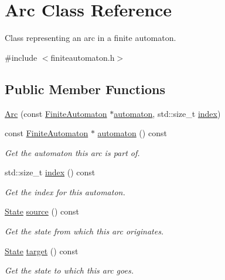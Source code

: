 \hypertarget{class_arc}{\section{\-Arc \-Class \-Reference}
\label{class_arc}
}


\-Class representing an arc in a finite automaton.  




{\ttfamily \#include $<$finiteautomaton.\-h$>$}

\subsection*{\-Public \-Member \-Functions}
\begin{DoxyCompactItemize}
\item 
\hyperlink{class_arc_afc8733da11af7ce496f5ca9dedcd1faf}{\-Arc} (const \hyperlink{class_finite_automaton}{\-Finite\-Automaton} $\ast$\hyperlink{class_arc_ae61665122fe9aed275bf86df4e7191a4}{automaton}, std\-::size\-\_\-t \hyperlink{class_arc_a9ae84977f950f68095f888e6faf60282}{index})
\item 
const \hyperlink{class_finite_automaton}{\-Finite\-Automaton} $\ast$ \hyperlink{class_arc_ae61665122fe9aed275bf86df4e7191a4}{automaton} () const 
\begin{DoxyCompactList}\small\item\em \-Get the automaton this arc is part of. \end{DoxyCompactList}\item 
std\-::size\-\_\-t \hyperlink{class_arc_a9ae84977f950f68095f888e6faf60282}{index} () const 
\begin{DoxyCompactList}\small\item\em \-Get the index for this automaton. \end{DoxyCompactList}\item 
\hyperlink{class_state}{\-State} \hyperlink{class_arc_ad7b1ba16c1449ba27e46af59b957aa2f}{source} () const 
\begin{DoxyCompactList}\small\item\em \-Get the state from which this arc originates. \end{DoxyCompactList}\item 
\hyperlink{class_state}{\-State} \hyperlink{class_arc_a765fcc6e938545fd1277cd766ba264b4}{target} () const 
\begin{DoxyCompactList}\small\item\em \-Get the state to which this arc goes. \end{DoxyCompactList}\item 

\end{DoxyCompactItemize}
